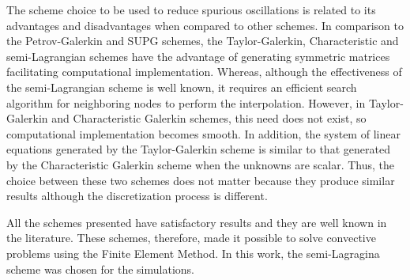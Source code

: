 \medskip
The scheme choice to be used to reduce spurious oscillations
 is related to its advantages and disadvantages when compared
 to other schemes. In comparison to the Petrov-Galerkin and
 SUPG schemes, the Taylor-Galerkin, Characteristic and
 semi-Lagrangian schemes have the advantage of generating
 symmetric matrices facilitating computational implementation.
 Whereas, although the effectiveness of the semi-Lagrangian scheme
 is well known, it requires an efficient search algorithm for
 neighboring nodes to perform the interpolation.
 However, in Taylor-Galerkin and Characteristic Galerkin schemes,
 this need does not exist, so computational implementation becomes
 smooth. In addition, the system of linear equations generated by
 the Taylor-Galerkin scheme is similar to that generated by
 the Characteristic Galerkin scheme when the unknowns are scalar.
 Thus, the choice between these two schemes does not matter because 
 they produce similar results although the discretization process
 is different.

\medskip
All the schemes presented have satisfactory results and
they are well known in the literature.
 These schemes, therefore, made it possible to solve
 convective problems using the Finite Element Method.
 In this work, the semi-Lagragina scheme was chosen for
 the simulations.
